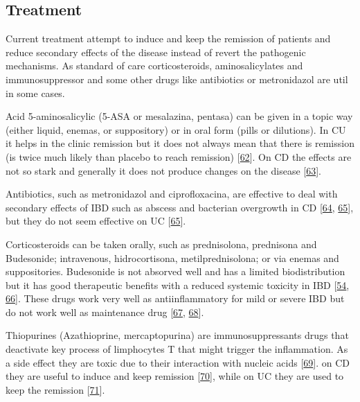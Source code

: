 \documentclass[
  12pt,
  a4paper,
  twoside,
  openright]{book}
\begin{document}
\hypertarget{treatment}{%
\subsection{Treatment}\label{treatment}}

Current treatment attempt to induce and keep the remission of patients and reduce secondary effects of the disease instead of revert the pathogenic mechanisms.
As standard of care corticosteroids, aminosalicylates and immunosuppressor and some other drugs like antibiotics or metronidazol are util in some cases.

Acid 5-aminosalicylic (5-ASA or mesalazina, pentasa) can be given in a topic way (either liquid, enemas, or suppository) or in oral form (pills or dilutions).
In CU it helps in the clinic remission but it does not always mean that there is remission (is twice much likely than placebo to reach remission) {[}\protect\hyperlink{ref-travis2006}{62}{]}.
On CD the effects are not so stark and generally it does not produce changes on the disease {[}\protect\hyperlink{ref-akobeng2016}{63}{]}.

Antibiotics, such as metronidazol and ciprofloxacina, are effective to deal with secondary effects of IBD such as abscess and bacterian overgrowth in CD {[}\protect\hyperlink{ref-feller2010}{64}, \protect\hyperlink{ref-prantera2009}{65}{]}, but they do not seem effective on UC {[}\protect\hyperlink{ref-prantera2009}{65}{]}.

Corticosteroids can be taken orally, such as prednisolona, prednisona and Budesonide; intravenous, hidrocortisona, metilprednisolona; or via enemas and suppositories.
Budesonide is not absorved well and has a limited biodistribution but it has good therapeutic benefits with a reduced systemic toxicity in IBD {[}\protect\hyperlink{ref-peyrin-biroulet2010}{54}, \protect\hyperlink{ref-rezaie2015}{66}{]}.
These drugs work very well as antiinflammatory for mild or severe IBD but do not work well as maintenance drug {[}\protect\hyperlink{ref-lichtenstein2009}{67}, \protect\hyperlink{ref-ouellette2001}{68}{]}.

Thiopurines (Azathioprine, mercaptopurina) are immunosuppressants drugs that deactivate key process of limphocytes T that might trigger the inflammation.
As a side effect they are toxic due to their interaction with nucleic acids {[}\protect\hyperlink{ref-warner2018}{69}{]}.
on CD they are useful to induce and keep remission {[}\protect\hyperlink{ref-chande2015}{70}{]}, while on UC they are used to keep the remission {[}\protect\hyperlink{ref-gisbert2009}{71}{]}.
\end{document}
